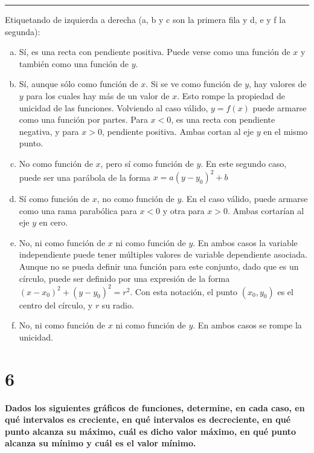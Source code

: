\documentclass{article}
\begin{document}
\hrule
\vspace{1em}

Etiquetando de izquierda a derecha (a, b y c son la primera fila y d, e y f la segunda):

\begin{enumerate}[(a)]
\item Sí, es una recta con pendiente positiva. Puede verse como una función de $x$ y también como una función de $y$.

\item Sí, aunque sólo como función de $x$. Si se ve como función de $y$, hay valores de $y$ para los cuales hay más de un valor de $x$. Esto rompe la propiedad de unicidad de las funciones. Volviendo al caso válido, $y = f(x)$ puede armarse como una función por partes. Para $x < 0$, es una recta con pendiente negativa, y para $x > 0$, pendiente positiva. Ambas cortan al eje $y$ en el mismo punto.

\item No como función de $x$, pero sí como función de $y$. En este segundo caso, puede ser una parábola de la forma $x = a (y-y_0)^2 + b$

\item Sí como función de $x$, no como función de $y$. En el caso válido, puede armarse como una rama parabólica para $x < 0$ y otra para $x > 0$. Ambas cortarían al eje $y$ en cero.

\item No, ni como función de $x$ ni como función de $y$. En ambos casos la variable independiente puede tener múltiples valores de variable dependiente asociada. Aunque no se pueda definir una función para este conjunto, dado que es un círculo, puede ser definido por una expresión de la forma $ (x-x_0)^2 + (y-y_0)^2 = r^2$. Con esta notación, el punto $(x_0, y_0)$ es el centro del círculo, y $r$ su radio.

\item No, ni como función de $x$ ni como función de $y$. En ambos casos se rompe la unicidad.

\end{enumerate}

\section*{6}
\label{sec:6}

\textbf{Dados los siguientes gráficos de funciones, determine, en cada caso, en qué intervalos es creciente, en qué intervalos es decreciente, en qué punto alcanza su máximo, cuál es dicho valor máximo, en qué punto alcanza su mínimo y cuál es el valor mínimo.}
\end{document}
